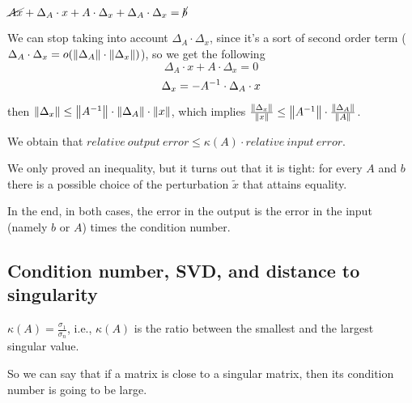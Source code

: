 \documentclass[computationalMathematics.tex]{subfiles}
\begin{document}
\begin{description}
    $\cancel{Ax} + \Delta_A \cdot x + A \cdot \Delta_x + \Delta_A \cdot \Delta_x = \cancel{b}$

We can stop taking into account $\Delta_A \cdot \Delta_x$, since it's a sort of second order term ($ \Delta_A \cdot \Delta_x = o (\left\lVert\Delta_A\right\rVert \cdot \left\lVert\Delta_x\right\rVert)$), so we get the following
  \[
      \Delta_A \cdot x + A \cdot \Delta_x = 0
  \]
  \[
      \Delta_x = -{A}^{-1} \cdot \Delta_A \cdot x
    \]

then $\left\lVert\Delta_x\right\rVert \le \left\lVert{A}^{-1}\right\rVert \cdot \left\lVert\Delta_A\right\rVert \cdot \left\lVert x\right\rVert$, which implies $\frac{\left\lVert\Delta_x\right\rVert}{\left\lVert x\right\rVert} \le \left\lVert{A}^{-1}\right\rVert \cdot \frac{\left\lVert\Delta_A\right\rVert}{\left\lVert A\right\rVert}$.

We obtain that $relative ~ output ~ error \le \kappa(A) \cdot relative ~ input ~ error$.
\end{description}
We only proved an inequality, but it turns out that it is tight: for every $A$ and $b$ there is a possible choice of the perturbation $\tilde{x}$ that attains equality.

In the end, in both cases, the error in the output is the error in the input (namely $b$ or $A$) times the condition number.

\subsection{Condition number, SVD, and distance to singularity}

\begin{proposition}
$\kappa(A) = \frac{\sigma_1}{\sigma_n}$, i.e., $\kappa(A)$ is the ratio between the smallest and the largest singular value.
\end{proposition}

So we can say that if a matrix is close to a singular matrix, then its condition number is going to be large.
\end{document}
